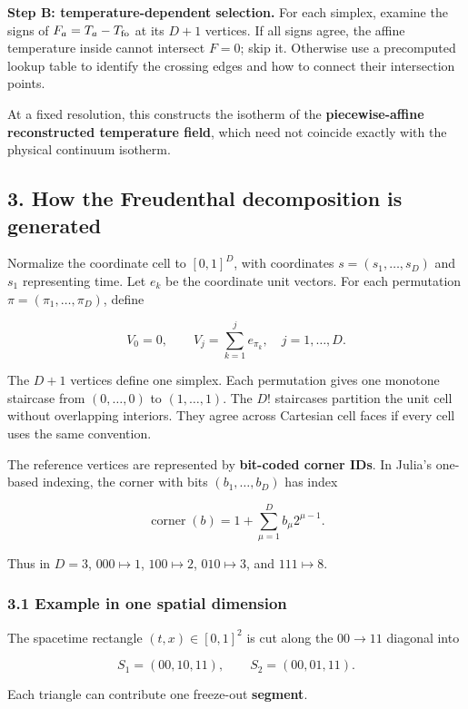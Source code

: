 \documentclass[
  10pt,
]{article}
\begin{document}
\textbf{Step B: temperature-dependent selection.} For each simplex,
examine the signs of \(F_a=T_a-T_{\rm fo}\) at its \(D+1\) vertices. If
all signs agree, the affine temperature inside cannot intersect \(F=0\);
skip it. Otherwise use a precomputed lookup table to identify the
crossing edges and how to connect their intersection points.

At a fixed resolution, this constructs the isotherm of the
\textbf{piecewise-affine reconstructed temperature field}, which need
not coincide exactly with the physical continuum isotherm.

\subsection{3. How the Freudenthal decomposition is
generated}\label{how-the-freudenthal-decomposition-is-generated}

Normalize the coordinate cell to \([0,1]^D\), with coordinates
\(s=(s_1,\ldots,s_D)\) and \(s_1\) representing time. Let \(e_k\) be the
coordinate unit vectors. For each permutation
\(\pi=(\pi_1,\ldots,\pi_D)\), define

\[
V_0=0,\qquad V_j=\sum_{k=1}^{j}e_{\pi_k},\quad j=1,\ldots,D.
\]

The \(D+1\) vertices define one simplex. Each permutation gives one
monotone staircase from \((0,\ldots,0)\) to \((1,\ldots,1)\). The \(D!\)
staircases partition the unit cell without overlapping interiors. They
agree across Cartesian cell faces if every cell uses the same
convention.

The reference vertices are represented by \textbf{bit-coded corner IDs}.
In Julia's one-based indexing, the corner with bits \((b_1,\ldots,b_D)\)
has index

\[
\operatorname{corner}(b)=1+\sum_{\mu=1}^{D}b_\mu 2^{\mu-1}.
\]

Thus in \(D=3\), \(000\mapsto1\), \(100\mapsto2\), \(010\mapsto3\), and
\(111\mapsto8\).

\subsubsection{3.1 Example in one spatial
dimension}\label{example-in-one-spatial-dimension}

The spacetime rectangle \((t,x)\in[0,1]^2\) is cut along the \(00\to11\)
diagonal into

\[
S_1=(00,10,11),\qquad S_2=(00,01,11).
\]

Each triangle can contribute one freeze-out \textbf{segment}.
\end{document}
